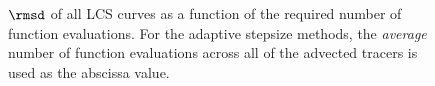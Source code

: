 \begin{figure}[htpb]
    \centering
    
    \caption[$\rmsd$ of all LCS curves as a function of the required number
    of function evaluations]
                {$\rmsd$ of all LCS curves as a function of the required number
                of function evaluations. For the adaptive stepsize methods,
                the \emph{average} number of function evaluations across all of
                the advected tracers is used as the abscissa value.}
    \label{fig:lcs_err_both}
\end{figure}
